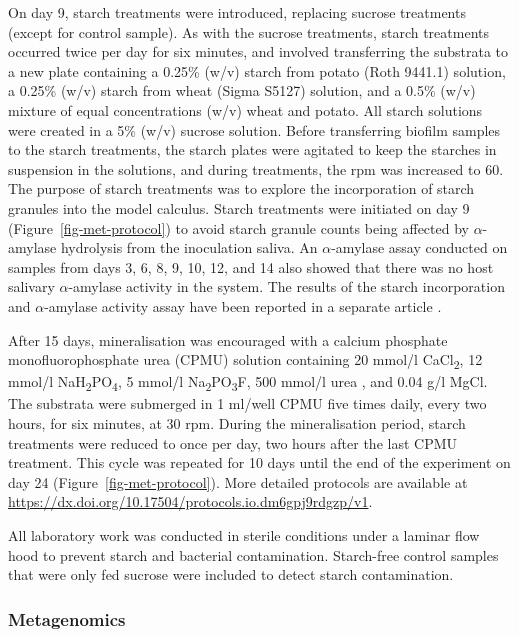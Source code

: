 \documentclass[10pt,a4paper]{article}
\begin{document}
On day 9, starch treatments were introduced, replacing sucrose
treatments (except for control sample). As with the sucrose treatments,
starch treatments occurred twice per day for six minutes, and involved
transferring the substrata to a new plate containing a 0.25\% (w/v)
starch from potato (Roth 9441.1) solution, a 0.25\% (w/v) starch from
wheat (Sigma S5127) solution, and a 0.5\% (w/v) mixture of equal
concentrations (w/v) wheat and potato. All starch solutions were created
in a 5\% (w/v) sucrose solution. Before transferring biofilm samples to
the starch treatments, the starch plates were agitated to keep the
starches in suspension in the solutions, and during treatments, the rpm
was increased to 60. The purpose of starch treatments was to explore the
incorporation of starch granules into the model calculus. Starch
treatments were initiated on day 9 (Figure~\ref{fig-met-protocol}) to
avoid starch granule counts being affected by \(\alpha\)-amylase
hydrolysis from the inoculation saliva. An \(\alpha\)-amylase assay
conducted on samples from days 3, 6, 8, 9, 10, 12, and 14 also showed
that there was no host salivary \(\alpha\)-amylase activity in the
system. The results of the starch incorporation and \(\alpha\)-amylase
activity assay have been reported in a separate article
\citep{bartholdyInvestigatingBiases2022}.

After 15 days, mineralisation was encouraged with a calcium phosphate
monofluorophosphate urea (CPMU) solution containing 20 mmol/l
CaCl\textsubscript{2}, 12 mmol/l
NaH\textsubscript{2}PO\textsubscript{4}, 5 mmol/l
Na\textsubscript{2}PO\textsubscript{3}F, 500 mmol/l urea
\citep{pearceConcomitantDeposition1987, sissonsMultistationPlaque1991},
and 0.04 g/l MgCl. The substrata were submerged in 1 ml/well CPMU five
times daily, every two hours, for six minutes, at 30 rpm. During the
mineralisation period, starch treatments were reduced to once per day,
two hours after the last CPMU treatment. This cycle was repeated for 10
days until the end of the experiment on day 24
(Figure~\ref{fig-met-protocol}). More detailed protocols are available
at \url{https://dx.doi.org/10.17504/protocols.io.dm6gpj9rdgzp/v1}.

All laboratory work was conducted in sterile conditions under a laminar
flow hood to prevent starch and bacterial contamination. Starch-free
control samples that were only fed sucrose were included to detect
starch contamination.

\subsubsection*{Metagenomics}\label{metagenomics}
\end{document}
